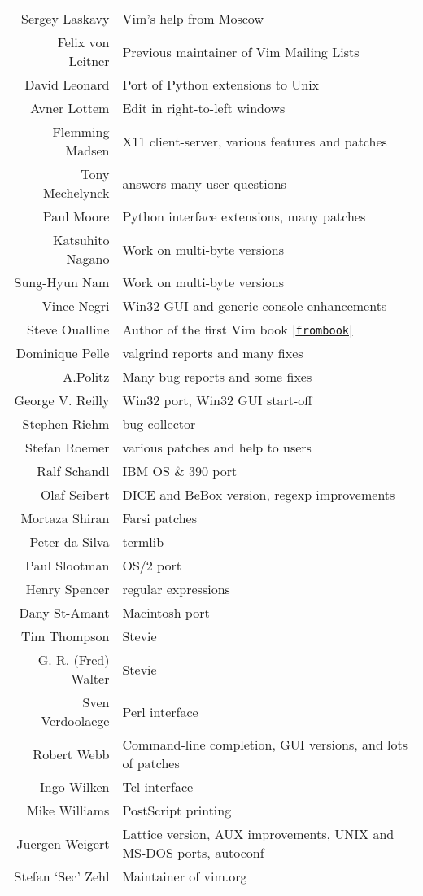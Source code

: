 \begin{longtable}{r l}
				Sergey Laskavy & Vim's help from Moscow\\
				Felix von Leitner & Previous maintainer of Vim Mailing Lists\\
				David Leonard & Port of Python extensions to Unix\\
				Avner Lottem & Edit in right-to-left windows\\
				Flemming Madsen & X11 client-server, various features and patches\\
				Tony Mechelynck & answers many user questions\\
				Paul Moore & Python interface extensions, many patches\\
				Katsuhito Nagano & Work on multi-byte versions\\
				Sung-Hyun Nam & Work on multi-byte versions\\
				Vince Negri & Win32 GUI and generic console enhancements\\
				Steve Oualline & Author of the first Vim book \hyperref[frombook]{|\texttt{frombook}|}\\
				Dominique Pelle & valgrind reports and many fixes\\
				A.Politz & Many bug reports and some fixes\\
				George V. Reilly & Win32 port, Win32 GUI start-off\\
				Stephen Riehm & bug collector\\
				Stefan Roemer & various patches and help to users\\
				Ralf Schandl & IBM OS \& 390 port\\
				Olaf Seibert & DICE and BeBox version, regexp improvements\\
				Mortaza Shiran & Farsi patches\\
				Peter da Silva & termlib\\
				Paul Slootman & OS/2 port\\
				Henry Spencer & regular expressions\\
				Dany St-Amant & Macintosh port\\
				Tim Thompson & Stevie\\
				G. R. (Fred) Walter & Stevie\\
				Sven Verdoolaege & Perl interface\\
				Robert Webb & Command-line completion, GUI versions, and lots of patches\\
				Ingo Wilken & Tcl interface\\
				Mike Williams & PostScript printing\\
				Juergen Weigert & Lattice version, AUX improvements, UNIX and MS-DOS ports, autoconf\\
				Stefan `Sec' Zehl & Maintainer of vim.org\\
\end{longtable}

